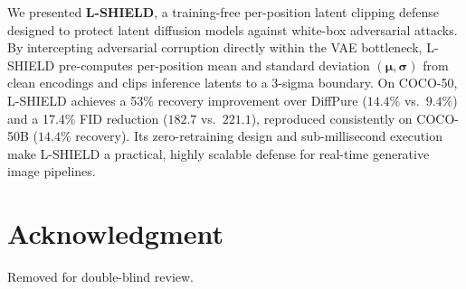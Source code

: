 \documentclass[conference]{IEEEtran}
\begin{document}
We presented \textbf{L-SHIELD}, a training-free per-position latent clipping defense designed to protect latent diffusion models against white-box adversarial attacks. By intercepting adversarial corruption directly within the VAE bottleneck, L-SHIELD pre-computes per-position mean and standard deviation $(\boldsymbol{\mu}, \boldsymbol{\sigma})$ from clean encodings and clips inference latents to a 3-sigma boundary. On COCO-50, L-SHIELD achieves a 53\% recovery improvement over DiffPure ($14.4\%$ vs.\ $9.4\%$) and a 17.4\% FID reduction ($182.7$ vs.\ $221.1$), reproduced consistently on COCO-50B ($14.4\%$ recovery). Its zero-retraining design and sub-millisecond execution make L-SHIELD a practical, highly scalable defense for real-time generative image pipelines.

\section*{Acknowledgment}
Removed for double-blind review.

\enlargethispage{35pt}
\balance

\small
\setlength{\itemsep}{0.1pt}
\vspace{-2pt}

\end{document}
